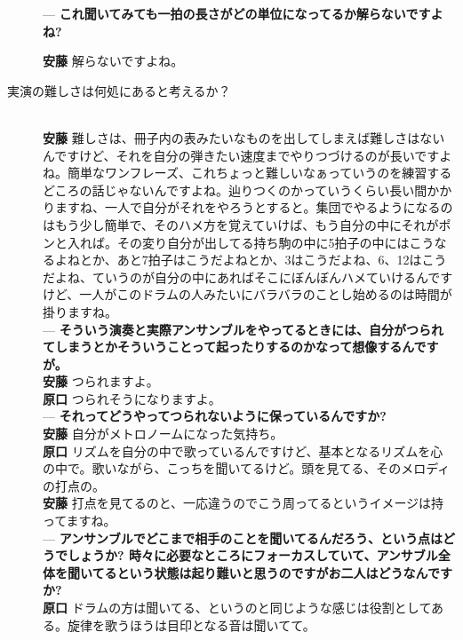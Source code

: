 \documentclass[uplatex,dvipdfmx]{ujarticle}
\begin{document}
\begin{description}
--- {\bf これ聞いてみても一拍の長さがどの単位になってるか解らないですよね?}

{\bf 安藤} 解らないですよね。\\

\item [実演の難しさは何処にあると考えるか？]\mbox{}\\

{\bf 安藤} 難しさは、冊子内の表みたいなものを出してしまえば難しさはないんですけど、それを自分の弾きたい速度までやりつづけるのが長いですよね。簡単なワンフレーズ、これちょっと難しいなぁっていうのを練習するどころの話じゃないんですよね。辿りつくのかっていうくらい長い間かかりますね、一人で自分がそれをやろうとすると。集団でやるようになるのはもう少し簡単で、そのハメ方を覚えていけば、もう自分の中にそれがポンと入れば。その変り自分が出してる持ち駒の中に5拍子の中にはこうなるよねとか、あと7拍子はこうだよねとか、3はこうだよね、6、12はこうだよね、ていうのが自分の中にあればそこにぼんぼんハメていけるんですけど、一人がこのドラムの人みたいにバラバラのことし始めるのは時間が掛りますね。\\

--- {\bf そういう演奏と実際アンサンブルをやってるときには、自分がつられてしまうとかそういうことって起ったりするのかなって想像するんですが。}\\

{\bf 安藤} つられますよ。\\

{\bf 原口} つられそうになりますよ。\\

--- {\bf それってどうやってつられないように保っているんですか?}\\

{\bf 安藤} 自分がメトロノームになった気持ち。\\

{\bf 原口} リズムを自分の中で歌っているんですけど、基本となるリズムを心の中で。歌いながら、こっちを聞いてるけど。頭を見てる、そのメロディの打点の。\\

{\bf 安藤} 打点を見てるのと、一応違うのでこう周ってるというイメージは持ってますね。\\

--- {\bf アンサンブルでどこまで相手のことを聞いてるんだろう、という点はどうでしょうか? 時々に必要なところにフォーカスしていて、アンサブル全体を聞いてるという状態は起り難いと思うのですがお二人はどうなんですか?}\\

{\bf 原口} ドラムの方は聞いてる、というのと同じような感じは役割としてある。旋律を歌うほうは目印となる音は聞いてて。\\


\end{description}
\end{document}
